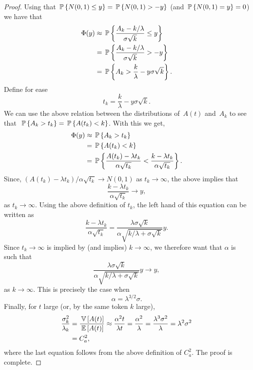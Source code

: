 \begin{proof}
Using that $\P{N(0,1) \leq y} =
\P{N(0,1) > -y}$ (and $\P{N(0,1)=y} = 0$) we have that
%
\begin{align*}
\Phi(y) &\approx \P{\frac{A_k - k/\lambda}{\sigma \sqrt k }\leq y} \\
        &= \P{\frac{A_k - k/\lambda}{\sigma \sqrt k} >  -y} \\
        &=  \P{A_k >  \frac k\lambda - y \sigma \sqrt k}.
\end{align*}
Define for ease
\begin{equation*}
t_k = \frac{k}\lambda - y \sigma \sqrt k.
\end{equation*}
We can use the above relation between the distributions of~$A(t)$
and~$A_k$ to see that~$\P{A_k >t_k } = \P{A(t_k) <k}$. With this we
get,
\begin{align*}
\Phi(y)
        &\approx  \P{A_k >  t_k } \\
        &=  \P{A(t_k) <  k } \\
        &=  \P{\frac{A(t_k) - \lambda t_k}{\alpha \sqrt{t_k}} < 
\frac{k-\lambda t_k}{\alpha \sqrt{t_k}}}.
\end{align*}
Since, $(A(t_k) - \lambda t_k)/ \alpha \sqrt{t_k} \to N(0,1)$
as $t_k \to \infty$, the above implies that
\begin{equation*}
\frac{k-\lambda t_k}{\alpha \sqrt{t_k}} \to y,
\end{equation*}
as $t_k \to \infty$.  Using the above definition of $t_k$, the left
hand of this equation can be written as
\begin{equation*}
\frac{k-\lambda t_k}{\alpha \sqrt{t_k}} =
\frac{\lambda \sigma \sqrt k }{\alpha \sqrt{k/\lambda + \sigma\sqrt k}} y.
\end{equation*}
Since $t_k \to \infty$ is implied by (and implies)
$k\to\infty$, we therefore want that $\alpha$ is such that
\begin{equation*}
\frac{\lambda \sigma \sqrt k }{\alpha \sqrt{k/\lambda + \sigma\sqrt k}} y \to y,
\end{equation*}
as $k\to\infty$. This is precisely the case when
\begin{equation*}
\alpha = \lambda^{3/2}\sigma.
\end{equation*}
Finally, for $t$ large (or, by the same token $k$ large),
\begin{align*}
\frac{\sigma_k^2}{\lambda_k} &= \frac{\V{A(t)}}{\E{A(t)}} \approx \frac{\alpha^2 t}{\lambda t} 
= \frac{\alpha^2}{\lambda} = \frac{\lambda^3\sigma^2}{\lambda} = \lambda^2 \sigma^2 \\
&= C_a^2,
\end{align*}
where the last equation follows from the above definition of $C_a^2$.  The proof is complete.
\end{proof}



